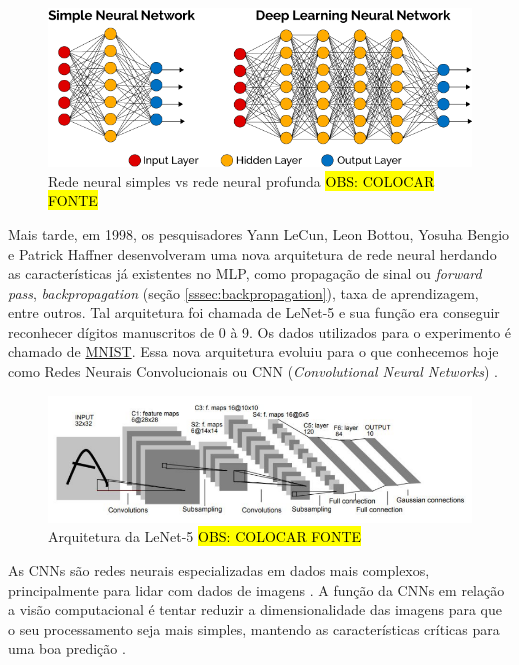 
\begin{figure}[H]
  \includegraphics[width=\linewidth]{figuras/simple-vs-deep-nn.png}
  \caption{Rede neural simples vs rede neural profunda \hl{OBS: COLOCAR FONTE}}
  \label{fig:simple-vs-deep-nn}
\end{figure}

Mais tarde, em 1998, os pesquisadores Yann LeCun, Leon Bottou, Yosuha Bengio e Patrick Haffner desenvolveram uma nova arquitetura de rede neural herdando as características já existentes no MLP, como propagação de sinal ou \textit{forward pass}, \textit{backpropagation} (seção \ref{sssec:backpropagation}), taxa de aprendizagem, entre outros. Tal arquitetura foi chamada de LeNet-5 \cite{le-net} e sua função era conseguir reconhecer dígitos manuscritos de 0 à 9. Os dados utilizados para o experimento é chamado de \href{http://yann.lecun.com/exdb/mnist/}{MNIST}. Essa nova arquitetura evoluiu para o que conhecemos hoje como Redes Neurais Convolucionais ou CNN (\textit{Convolutional Neural Networks}) \cite{goodfellow-et-al-2016}.

\begin{figure}[H]
  \includegraphics[width=\linewidth]{figuras/le-net.png}
  \caption{Arquitetura da LeNet-5 \hl{OBS: COLOCAR FONTE}}
  \label{fig:le-net}
\end{figure}

As CNNs são redes neurais especializadas em dados mais complexos, principalmente para lidar com dados de imagens \cite{goodfellow-et-al-2016}. A função da CNNs em relação a visão computacional é tentar reduzir a dimensionalidade das imagens para que o seu processamento seja mais simples, mantendo as características críticas para uma boa predição \cite{comprehensive-guide-to-cvv}.


